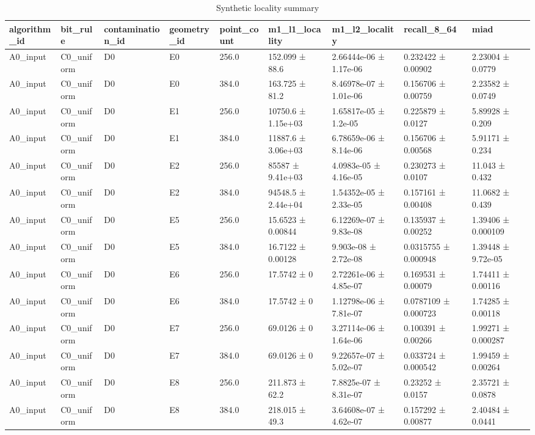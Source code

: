 \begin{table}
\caption{Synthetic locality summary}
\label{tab:synthetic\_locality}
\begin{tabular}{lllllllll}
\toprule
algorithm\_id & bit\_rule & contamination\_id & geometry\_id & point\_count & m1\_l1\_locality & m1\_l2\_locality & recall\_8\_64 & miad \\
\midrule
A0\_input & C0\_uniform & D0 & E0 & 256.0 & 152.099 ± 88.6 & 2.66444e-06 ± 1.17e-06 & 0.232422 ± 0.00902 & 2.23004 ± 0.0779 \\
A0\_input & C0\_uniform & D0 & E0 & 384.0 & 163.725 ± 81.2 & 8.46978e-07 ± 1.01e-06 & 0.156706 ± 0.00759 & 2.23582 ± 0.0749 \\
A0\_input & C0\_uniform & D0 & E1 & 256.0 & 10750.6 ± 1.15e+03 & 1.65817e-05 ± 1.2e-05 & 0.225879 ± 0.0127 & 5.89928 ± 0.209 \\
A0\_input & C0\_uniform & D0 & E1 & 384.0 & 11887.6 ± 3.06e+03 & 6.78659e-06 ± 8.14e-06 & 0.156706 ± 0.00568 & 5.91171 ± 0.234 \\
A0\_input & C0\_uniform & D0 & E2 & 256.0 & 85587 ± 9.41e+03 & 4.0983e-05 ± 4.16e-05 & 0.230273 ± 0.0107 & 11.043 ± 0.432 \\
A0\_input & C0\_uniform & D0 & E2 & 384.0 & 94548.5 ± 2.44e+04 & 1.54352e-05 ± 2.33e-05 & 0.157161 ± 0.00408 & 11.0682 ± 0.439 \\
A0\_input & C0\_uniform & D0 & E5 & 256.0 & 15.6523 ± 0.00844 & 6.12269e-07 ± 9.83e-08 & 0.135937 ± 0.00252 & 1.39406 ± 0.000109 \\
A0\_input & C0\_uniform & D0 & E5 & 384.0 & 16.7122 ± 0.00128 & 9.903e-08 ± 2.72e-08 & 0.0315755 ± 0.000948 & 1.39448 ± 9.72e-05 \\
A0\_input & C0\_uniform & D0 & E6 & 256.0 & 17.5742 ± 0 & 2.72261e-06 ± 4.85e-07 & 0.169531 ± 0.00079 & 1.74411 ± 0.00116 \\
A0\_input & C0\_uniform & D0 & E6 & 384.0 & 17.5742 ± 0 & 1.12798e-06 ± 7.81e-07 & 0.0787109 ± 0.000723 & 1.74285 ± 0.00118 \\
A0\_input & C0\_uniform & D0 & E7 & 256.0 & 69.0126 ± 0 & 3.27114e-06 ± 1.64e-06 & 0.100391 ± 0.00266 & 1.99271 ± 0.000287 \\
A0\_input & C0\_uniform & D0 & E7 & 384.0 & 69.0126 ± 0 & 9.22657e-07 ± 5.02e-07 & 0.033724 ± 0.000542 & 1.99459 ± 0.00264 \\
A0\_input & C0\_uniform & D0 & E8 & 256.0 & 211.873 ± 62.2 & 7.8825e-07 ± 8.31e-07 & 0.23252 ± 0.0157 & 2.35721 ± 0.0878 \\
A0\_input & C0\_uniform & D0 & E8 & 384.0 & 218.015 ± 49.3 & 3.64608e-07 ± 4.62e-07 & 0.157292 ± 0.00877 & 2.40484 ± 0.0441 \\

\end{tabular}
\end{table}
